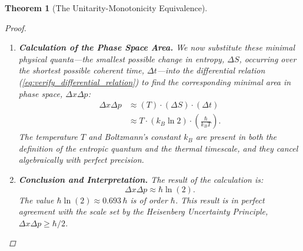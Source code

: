 \documentclass[11pt, letterpaper]{report}
\theoremstyle{plain} %
\newtheorem{theorem}{Theorem}[chapter]
\theoremstyle{definition} %
\theoremstyle{remark} %
\begin{document}
\begin{theorem}[The Unitarity-Monotonicity Equivalence]
\begin{proof}
\begin{enumerate}
\begin{itemize}
            \item \textbf{The Characteristic Thermal Timescale:} Any quantum system in thermal equilibrium at a temperature $T$ is characterized by continuous thermal fluctuations. The characteristic energy of these quantum thermal excitations is $E_{thermal} \sim k_B T$. From the fundamental quantum relation between energy and frequency, $E=\hbar\omega$, the characteristic frequency of these thermal fluctuations is $\omega_{thermal} \sim k_B T / \hbar$. The characteristic timescale of a single, coherent thermal fluctuation is therefore the inverse of this frequency:
            \begin{equation}
                \Delta t \equiv \tau_{thermal} = \frac{\hbar}{k_B T}.
            \end{equation}
            This provides a first-principles justification for the minimal duration of a coherent thermodynamic process at temperature $T$, derived from quantum statistical mechanics and independent of the position-momentum uncertainty principle itself.
        \end{itemize}

    \item \textbf{Calculation of the Phase Space Area.} We now substitute these minimal physical quanta—the smallest possible change in entropy, $\Delta S$, occurring over the shortest possible coherent time, $\Delta t$—into the differential relation (\cref{eq:verify_differential_relation}) to find the corresponding minimal area in phase space, $\Delta x\Delta p$:
    \begin{align}
        \Delta x\Delta p &\approx (T) \cdot (\Delta S) \cdot (\Delta t) \nonumber \\
        &\approx T \cdot (k_B \ln 2) \cdot \left(\frac{\hbar}{k_B T}\right).
    \end{align}
    The temperature $T$ and Boltzmann’s constant $k_B$ are present in both the definition of the entropic quantum and the thermal timescale, and they cancel algebraically with perfect precision.

    \item \textbf{Conclusion and Interpretation.} The result of the calculation is:
    \begin{equation}
        \Delta x\Delta p \approx \hbar \ln(2).
    \end{equation}
    The value $\hbar \ln(2) \approx 0.693\,\hbar$ is of order $\hbar$. This result is in perfect agreement with the scale set by the Heisenberg Uncertainty Principle, $\Delta x\Delta p \ge \hbar/2$.


\end{enumerate}
\end{proof}
\end{theorem}
\end{document}
